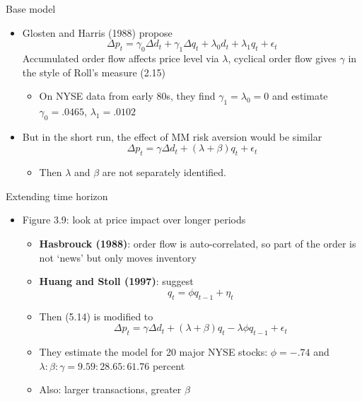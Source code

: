 \documentclass[english,10pt]{beamer}
\begin{document}
\begin{frame}[label=base]{Base model}
	\begin{itemize}
		\item Glosten and Harris (1988) propose
		\begin{equation} \tag{5.7}
		\Delta p_t = \gamma_0 \Delta d_t+ \gamma_1 \Delta q_t + \lambda_0 d_t + \lambda_1 q_t + \epsilon_t%
		\end{equation}%
		Accumulated order flow affects price level via $\lambda$, cyclical order flow gives $\gamma$ in the style of Roll's measure (2.15)
		\begin{itemize}
			\item On NYSE data from early 80s, they find $\gamma_1=\lambda_0=0$ and estimate $\gamma_0=.0465$, $\lambda_1=.0102$
		\end{itemize}
		\item But in the short run, the effect of MM risk aversion would be similar
		\begin{equation} \tag{5.14}
		\Delta p_t = \gamma \Delta d_t + (\lambda + \beta) q_t + \epsilon_t
		\end{equation}
		\begin{itemize}
			\item Then $\lambda$ and $\beta$ are not separately identified. \hyperlink{example2}{}
		\end{itemize}
	\end{itemize}
\end{frame}


\begin{frame}[label=extending]{Extending time horizon}
	\begin{itemize}
		\item Figure 3.9: look at price impact over longer periods
		\begin{itemize}
			\item \textbf{Hasbrouck (1988)}: order flow is auto-correlated, so part of the order is not `news' but only moves inventory
			\item \textbf{Huang and Stoll (1997)}: suggest
			\begin{equation}\tag{5.17}
			q_t = \phi q_{t-1} + \eta_t
			\end{equation}
			\item Then (5.14) is modified to \hyperlink{derivation}{}
			\begin{equation} \tag{5.21}
			\Delta p_t = \gamma \Delta d_t + (\lambda+\beta)q_t - \lambda \phi q_{t-1} + \epsilon_t
			\end{equation}
			\item They estimate the model for 20 major NYSE stocks: $\phi = -.74$ and $ \lambda : \beta :\gamma = 9.59 : 28.65 : 61.76$ percent
			\item Also: larger transactions, greater $\beta$  \hyperlink{example3}{}
		\end{itemize}
	\end{itemize}
\end{frame}
\end{document}
